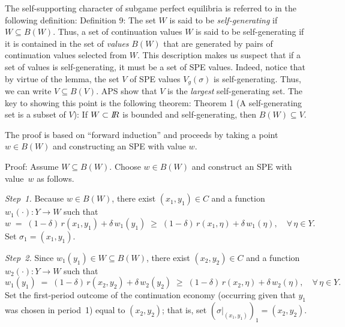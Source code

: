 The self-supporting character of subgame perfect equilibria is referred to in
the following definition:
\medskip\noindent
{\sc Definition 9:}  The set $W$ is said to be {\it self-generating\/} if
$W\subseteq B(W)$.  
\medskip
Thus, a set of continuation values  $W$ is said to be self-generating if it is contained
in the set of {\it values\/} $B(W)$
that are generated by pairs of continuation values selected from $W$. This description makes us suspect that if a set of
values is self-generating, it must be a set of SPE
values.    Indeed, notice that
by virtue of the lemma, the set $V$ of SPE values $V_g (\sigma)$ is
self-generating. Thus, we can write
$V\subseteq B(V)$.  APS
show that $V$ is the {\it largest\/} self-generating set.  The key to showing
this point is the following theorem:
\medskip\noindent
{\sc Theorem 1} (A self-generating set is a subset of $V$): If $W\subset {I\kern-0.3em R}$ is bounded and
self-generating, then $B(W)\subseteq V$.

\medskip\noindent
The proof is based on ``forward induction'' and
proceeds  by taking a point $w\in  B(W)$ and
constructing an SPE with value $w$.

\medskip\noindent
{\sc Proof:}
Assume $W\subseteq B(W)$.  Choose $w\in B(W)$ and construct an SPE
with value~$w$ as follows.

\medskip\noindent
{\it Step~1.\/}
Because $w\in B(W)$, there exist $(x_1,y_1)\in C$ and a function
$w_1(\cdot):Y\to W$ such that
$$  w \;=\; (1-\delta)\,r(x_1,y_1)+\delta\,w_1(y_1)
    \;\geq\;
    (1-\delta)\,r(x_1,\eta)+\delta\,w_1(\eta) ,
    \quad \forall\,\eta\in Y .  $$
Set $\sigma_1=(x_1,y_1)$.

\medskip\noindent
{\it Step~2.\/}
Since $w_1(y_1)\in W\subseteq B(W)$, there exist $(x_2,y_2)\in C$ and
a function $w_2(\cdot):Y\to W$ such that
$$  w_1(y_1) \;=\; (1-\delta)\,r(x_2,y_2)+\delta\,w_2(y_2)
    \;\geq\;
    (1-\delta)\,r(x_2,\eta)+\delta\,w_2(\eta) ,
    \quad \forall\,\eta\in Y .  $$
Set the first-period outcome of the continuation economy (occurring
given that $y_1$ was chosen in period~1) equal to $(x_2,y_2)$; that
is, set $(\sigma|_{(x_1,y_1)})_1=(x_2,y_2)$.

